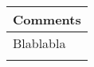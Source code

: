 \begin{longtable}{>{\raggedright\arraybackslash}p{14.2cm}}
	
	\toprule[2pt]
	
	\textbf{Comments} 
	\\ \midrule[1.5pt] 
	
	Blablabla \\
	\bottomrule[2pt]
	
	\label{table_resourcecomments}
\end{longtable}